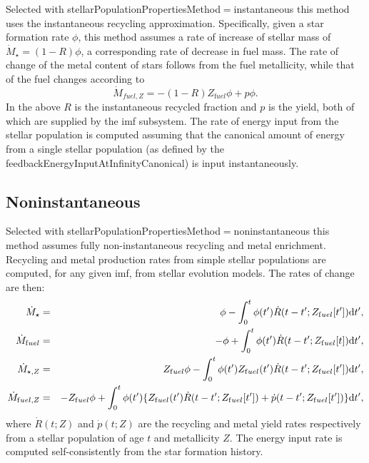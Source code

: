 Selected with {\normalfont \ttfamily stellarPopulationPropertiesMethod}$=${\normalfont \ttfamily instantaneous} this method uses the instantaneous recycling approximation. Specifically, given a star formation rate $\phi$, this method assumes a rate of increase of stellar mass of $\dot{M}_\star=(1-R)\phi$, a corresponding rate of decrease in fuel mass. The rate of change of the metal content of stars follows from the fuel metallicity, while that of the fuel changes according to
\begin{equation}
 \dot{M}_{fuel,Z} = - (1-R) Z_{\mathrm fuel} \phi + p \phi.
\end{equation}
In the above $R$ is the instantaneous recycled fraction and $p$ is the yield, both of which are supplied by the \gls{imf} subsystem. The rate of energy input from the stellar population is computed assuming that the canonical amount of energy from a single stellar population (as defined by the {\normalfont \ttfamily feedbackEnergyInputAtInfinityCanonical}) is input instantaneously.

\subsection{Noninstantaneous}

Selected with {\normalfont \ttfamily stellarPopulationPropertiesMethod}$=${\normalfont \ttfamily noninstantaneous} this method assumes fully non-instantaneous recycling and metal enrichment. Recycling and metal production rates from simple stellar populations are computed, for any given \gls{imf}, from stellar evolution models. The rates of change are then:
\begin{eqnarray}
 \dot{M}_\star &=& \phi - \int_0^t \phi(t^\prime) \dot{R}(t-t^\prime;Z_{\mathrm fuel}[t^\prime]) \d t^\prime, \\
 \dot{M}_{\mathrm fuel} &=& -\phi + \int_0^t \phi(t^\prime) \dot{R}(t-t^\prime;Z_{\mathrm fuel}[t]) \d t^\prime, \\
 \dot{M}_{\star,Z} &=& Z_{\mathrm fuel} \phi - \int_0^t \phi(t^\prime) Z_{\mathrm fuel}(t^\prime)  \dot{R}(t-t^\prime;Z_{\mathrm fuel}[t^\prime]) \d t^\prime, \\
 \dot{M}_{{\mathrm fuel},Z} &=& -Z_{\mathrm fuel} \phi + \int_0^t  \phi(t^\prime) \{ Z_{\mathrm fuel}(t^\prime) \dot{R}(t-t^\prime;Z_{\mathrm fuel}[t^\prime]) + \dot{p}(t-t^\prime;Z_{\mathrm fuel}[t^\prime]) \} \d t^\prime, \\
\end{eqnarray}
where $\dot{R}(t;Z)$ and $\dot{p}(t;Z)$ are the recycling and metal yield rates respectively from a stellar population of age $t$ and metallicity $Z$. The energy input rate is computed self-consistently from the star formation history.

